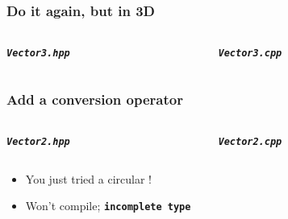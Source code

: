 \documentclass[glossy]{beamer}
\newcommand{\filename}[1]{\texttt{\textbf{\emph{#1}}}}
\begin{document}

\begin{frame}[fragile=singleslide]
  \frametitle{Do it again, but in 3D}
  
  \begin{columns}[t]
    \begin{column}{5.5cm}
      \filename{Vector3.hpp}
    \end{column}

    \begin{column}{6cm}
      \filename{Vector3.cpp}
    \end{column}
  \end{columns}
\end{frame}


\begin{frame}[fragile=singleslide]
  \frametitle{Add a conversion operator}
  
  \begin{columns}[t]
    \begin{column}{6cm}
      \filename{Vector2.hpp}
    \end{column}

    \begin{column}{6cm}
      \filename{Vector2.cpp}
    \end{column}
  \end{columns}
  
  \begin{itemize}
    \item You just tried a circular !
    \item Won't compile; \texttt{\textbf{incomplete type}}
  \end{itemize}
\end{frame}

\end{document}
